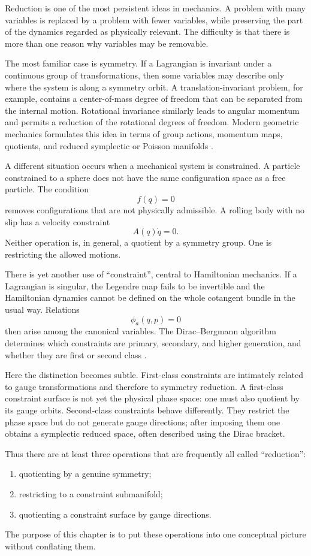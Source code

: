 Reduction is one of the most persistent ideas in mechanics.  A problem with
many variables is replaced by a problem with fewer variables, while preserving
the part of the dynamics regarded as physically relevant.  The difficulty is
that there is more than one reason why variables may be removable.

The most familiar case is symmetry.  If a Lagrangian is invariant under a
continuous group of transformations, then some variables may describe only
where the system is along a symmetry orbit.  A translation-invariant problem,
for example, contains a center-of-mass degree of freedom that can be separated
from the internal motion.  Rotational invariance similarly leads to angular
momentum and permits a reduction of the rotational degrees of freedom.
Modern geometric mechanics formulates this idea in terms of group actions,
momentum maps, quotients, and reduced symplectic or Poisson manifolds
\cite{MarsdenWeinstein1974}.

A different situation occurs when a mechanical system is constrained.  A
particle constrained to a sphere does not have the same configuration space
as a free particle.  The condition
\[
        f(q)=0
\]
removes configurations that are not physically admissible.  A rolling body
with no slip has a velocity constraint
\[
        A(q)\dot q=0.
\]
Neither operation is, in general, a quotient by a symmetry group.  One is
restricting the allowed motions.

There is yet another use of ``constraint'', central to Hamiltonian mechanics.
If a Lagrangian is singular, the Legendre map fails to be invertible and the
Hamiltonian dynamics cannot be defined on the whole cotangent bundle in the
usual way.  Relations
\[
        \phi_a(q,p)=0
\]
then arise among the canonical variables.  The Dirac--Bergmann algorithm
determines which constraints are primary, secondary, and higher generation,
and whether they are first or second class
\cite{Dirac1964,HenneauxTeitelboim1992}.

Here the distinction becomes subtle.  First-class constraints are intimately
related to gauge transformations and therefore to symmetry reduction.  A
first-class constraint surface is not yet the physical phase space: one must
also quotient by its gauge orbits.  Second-class constraints behave
differently.  They restrict the phase space but do not generate gauge
directions; after imposing them one obtains a symplectic reduced space, often
described using the Dirac bracket.

Thus there are at least three operations that are frequently all called
``reduction'':
\begin{enumerate}[label=(\roman*)]
\item quotienting by a genuine symmetry;
\item restricting to a constraint submanifold;
\item quotienting a constraint surface by gauge directions.
\end{enumerate}
The purpose of this chapter is to put these operations into one conceptual
picture without conflating them.

